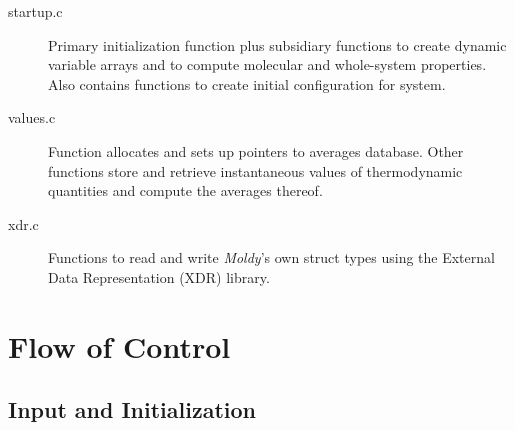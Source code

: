 \documentclass[a4paper,twoside]{report}
\newcommand{\Fname}[1]{{\upshape\mdseries\sffamily#1}}
\newenvironment{Fndescription}{\begingroup%
     \renewcommand{\descriptionlabel}[1]{\Fname{##1}}\begin{description}}%
     {\end{description}\endgroup}
\newcommand{\moldy}{\emph{Moldy}}
\begin{document}
\begin{Fndescription}
\item[startup.c] Primary initialization function 
  plus subsidiary functions  to create
  dynamic variable arrays and  to compute
  molecular and whole-system properties.  Also contains functions to
  create initial configuration for system.
\item[values.c] Function  allocates and sets
  up pointers to averages database.  Other functions store and
  retrieve instantaneous values of thermodynamic quantities and
  compute the averages thereof.
\item[xdr.c] Functions to read and write \moldy's own struct types
  using the External Data Representation (XDR) library.
\end{Fndescription}

\section{Flow of Control}%
\subsection{Input and Initialization}
\label{sec:startup}
\end{document}
